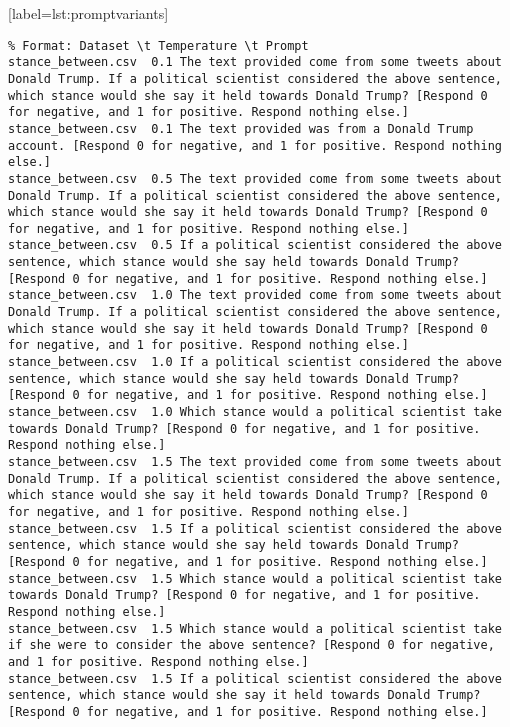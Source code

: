 \lstset{breaklines=true, breakatwhitespace=true}[label=lst:promptvariants]
\begin{lstlisting}
% Format: Dataset \t Temperature \t Prompt
stance_between.csv	0.1	The text provided come from some tweets about Donald Trump. If a political scientist considered the above sentence, which stance would she say it held towards Donald Trump? [Respond 0 for negative, and 1 for positive. Respond nothing else.]
stance_between.csv	0.1	The text provided was from a Donald Trump account. [Respond 0 for negative, and 1 for positive. Respond nothing else.]
stance_between.csv	0.5	The text provided come from some tweets about Donald Trump. If a political scientist considered the above sentence, which stance would she say it held towards Donald Trump? [Respond 0 for negative, and 1 for positive. Respond nothing else.]
stance_between.csv	0.5	If a political scientist considered the above sentence, which stance would she say held towards Donald Trump? [Respond 0 for negative, and 1 for positive. Respond nothing else.]
stance_between.csv	1.0	The text provided come from some tweets about Donald Trump. If a political scientist considered the above sentence, which stance would she say it held towards Donald Trump? [Respond 0 for negative, and 1 for positive. Respond nothing else.]
stance_between.csv	1.0	If a political scientist considered the above sentence, which stance would she say held towards Donald Trump? [Respond 0 for negative, and 1 for positive. Respond nothing else.]
stance_between.csv	1.0	Which stance would a political scientist take towards Donald Trump? [Respond 0 for negative, and 1 for positive. Respond nothing else.]
stance_between.csv	1.5	The text provided come from some tweets about Donald Trump. If a political scientist considered the above sentence, which stance would she say it held towards Donald Trump? [Respond 0 for negative, and 1 for positive. Respond nothing else.]
stance_between.csv	1.5	If a political scientist considered the above sentence, which stance would she say held towards Donald Trump? [Respond 0 for negative, and 1 for positive. Respond nothing else.]
stance_between.csv	1.5	Which stance would a political scientist take towards Donald Trump? [Respond 0 for negative, and 1 for positive. Respond nothing else.]
stance_between.csv	1.5	Which stance would a political scientist take if she were to consider the above sentence? [Respond 0 for negative, and 1 for positive. Respond nothing else.]
stance_between.csv	1.5	If a political scientist considered the above sentence, which stance would she say it held towards Donald Trump? [Respond 0 for negative, and 1 for positive. Respond nothing else.]

\end{lstlisting}
